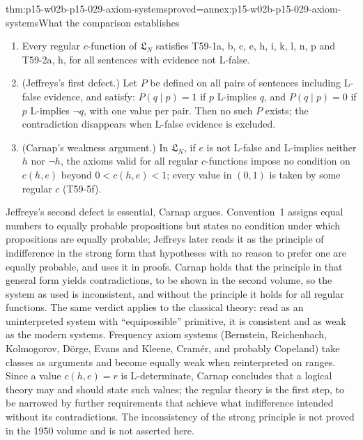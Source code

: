 \begin{hbtheorem}{thm:p15-w02b-p15-029-axiom-systems}{proved=annex:p15-w02b-p15-029-axiom-systems}{What the comparison establishes}
\begin{enumerate}
 \item Every regular \(c\)-function of \(\mathfrak L_N\) satisfies
       T59-1a, b, c, e, h, i, k, l, n, p and T59-2a, h, for all
       sentences with evidence not L-false.
 \item (Jeffreys's first defect.) Let \(P\) be defined on all pairs of
       sentences including L-false evidence, and satisfy: \(P(q\mid p)=1\)
       if \(p\) L-implies \(q\), and \(P(q\mid p)=0\) if \(p\) L-implies
       \(\neg q\), with one value per pair. Then no such \(P\) exists;
       the contradiction disappears when L-false evidence is excluded.
 \item (Carnap's weakness argument.) In \(\mathfrak L_N\), if \(e\) is
       not L-false and L-implies neither \(h\) nor \(\neg h\), the
       axioms valid for all regular \(c\)-functions impose no condition
       on \(c(h,e)\) beyond \(0<c(h,e)<1\); every value in \((0,1)\) is
       taken by some regular \(c\) (T59-5f).
\end{enumerate}
\end{hbtheorem}

Jeffreys's second defect is essential, Carnap argues. Convention~1
assigns equal numbers to equally probable propositions but states no
condition under which propositions are equally probable; Jeffreys later
reads it as the principle of indifference in the strong form that
hypotheses with no reason to prefer one are equally probable, and uses
it in proofs. Carnap holds that the principle in that general form
yields contradictions, to be shown in the second volume, so the system
as used is inconsistent, and without the principle it holds for all
regular functions. The same verdict applies to the classical theory:
read as an uninterpreted system with ``equipossible'' primitive, it is
consistent and as weak as the modern systems. Frequency axiom systems
(Bernstein, Reichenbach, Kolmogorov, D\"orge, Evans and Kleene,
Cram\'er, and probably Copeland) take classes as arguments and become
equally weak when reinterpreted on ranges. Since a value \(c(h,e)=r\)
is L-determinate, Carnap concludes that a logical theory may and should
state such values; the regular theory is the first step, to be narrowed
by further requirements that achieve what indifference intended without
its contradictions. The inconsistency of the strong principle is not
proved in the 1950 volume and is not asserted here.

